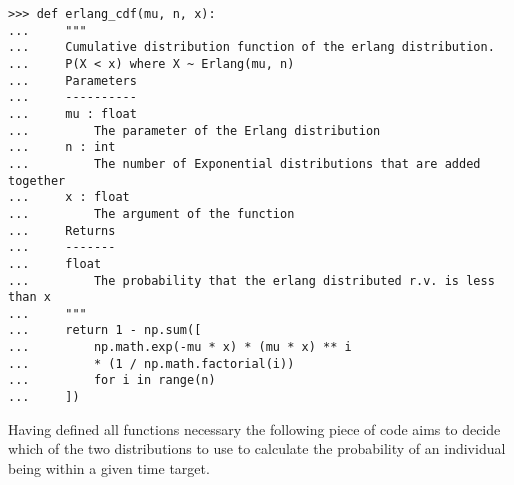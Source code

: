 \begin{lstlisting}[style=pystyle] 
>>> def erlang_cdf(mu, n, x):
...     """
...     Cumulative distribution function of the erlang distribution.
...     P(X < x) where X ~ Erlang(mu, n)
...     Parameters
...     ----------
...     mu : float
...         The parameter of the Erlang distribution
...     n : int
...         The number of Exponential distributions that are added together
...     x : float
...         The argument of the function
...     Returns
...     -------
...     float
...         The probability that the erlang distributed r.v. is less than x
...     """
...     return 1 - np.sum([
...         np.math.exp(-mu * x) * (mu * x) ** i
...         * (1 / np.math.factorial(i))
...         for i in range(n)
...     ])

\end{lstlisting}

Having defined all functions necessary the following piece of code aims to
decide which of the two distributions to use to calculate the probability
of an individual being within a given time target.

